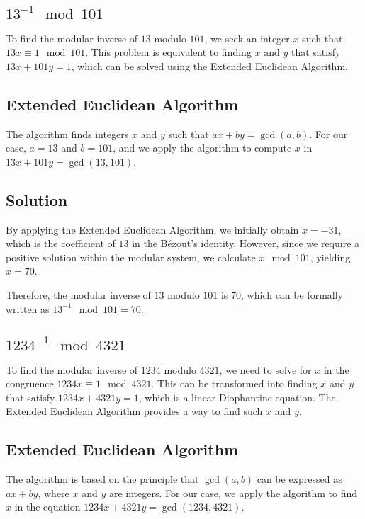 \documentclass[9pt]{article}
\begin{document}
\begin{CJK*}{UTF8}{gbsn}
\subsection{$ 13^{-1} \mod 101$}

To find the modular inverse of \(13\) modulo \(101\), we seek an integer \(x\) such that \(13x \equiv 1 \mod 101\). This problem is equivalent to finding \(x\) and \(y\) that satisfy \(13x + 101y = 1\), which can be solved using the Extended Euclidean Algorithm.

\subsection*{Extended Euclidean Algorithm}
The algorithm finds integers \(x\) and \(y\) such that \(ax + by = \gcd(a, b)\). For our case, \(a = 13\) and \(b = 101\), and we apply the algorithm to compute \(x\) in \(13x + 101y = \gcd(13, 101)\).

\subsection*{Solution}
By applying the Extended Euclidean Algorithm, we initially obtain \(x = -31\), which is the coefficient of \(13\) in the Bézout's identity. However, since we require a positive solution within the modular system, we calculate \(x \mod 101\), yielding \(x = 70\).

Therefore, the modular inverse of \(13\) modulo \(101\) is \(70\), which can be formally written as \(13^{-1} \mod 101 = 70\).


\subsection{$1234^{-1} \mod 4321$}

To find the modular inverse of \(1234\) modulo \(4321\), we need to solve for \(x\) in the congruence \(1234x \equiv 1 \mod 4321\). This can be transformed into finding \(x\) and \(y\) that satisfy \(1234x + 4321y = 1\), which is a linear Diophantine equation. The Extended Euclidean Algorithm provides a way to find such \(x\) and \(y\).

\subsection*{Extended Euclidean Algorithm}
The algorithm is based on the principle that \(\gcd(a, b)\) can be expressed as \(ax + by\), where \(x\) and \(y\) are integers. For our case, we apply the algorithm to find \(x\) in the equation \(1234x + 4321y = \gcd(1234, 4321)\).


\end{CJK*}
\end{document}
